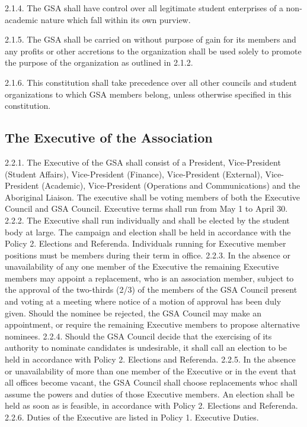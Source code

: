 \documentclass{article}
\begin{document}
2.1.4. The GSA shall have control over all legitimate student enterprises of a non-academic nature which fall within its own purview. 

2.1.5. The GSA shall be carried on without purpose of gain for its members 
and any profits or other accretions to the organization shall be used 
solely to promote the purpose of the organization as outlined in 2.1.2. 

2.1.6. This constitution shall take precedence over all other councils and 
student organizations to which GSA members belong, unless otherwise 
specified in this constitution. 
\subsection{The Executive of the Association }
2.2.1. The Executive of the GSA shall consist of a President, Vice-President (Student Affairs), Vice-President (Finance), Vice-President (External), 
Vice-President (Academic), Vice-President (Operations and Communications) and the Aboriginal Liaison. The executive shall be voting members of both the Executive Council and GSA Council. Executive terms shall run from May 1 to April 30. 
2.2.2. The Executive shall run individually and shall be elected by the student body at large. The campaign and election shall be held in accordance with the Policy 2. Elections and Referenda. Individuals running for Executive member positions must be members during their term in office. 
2.2.3. In the absence or unavailability of any one member of the Executive the remaining Executive members may appoint a replacement, who is an association member, subject to the approval of the two-thirds (2/3) of the members of the GSA Council present and voting at a meeting where notice of a motion of approval has been duly given. Should the nominee be rejected, the GSA Council may make an appointment, or require the remaining Executive members to propose alternative nominees. 
2.2.4. Should the GSA Council decide that the exercising of its authority to nominate candidates is undesirable, it shall call an election to be held in accordance with Policy 2. Elections and Referenda. 
2.2.5. In the absence or unavailability of more than one member of the 
Executive or in the event that all offices become vacant, the GSA 
Council shall choose replacements whoc shall assume the powers and 
duties of those Executive members. An election shall be held as soon 
as is feasible, in accordance with Policy 2. Elections and Referenda. 
2.2.6. Duties of the Executive are listed in Policy 1. Executive Duties. 
\end{document}
